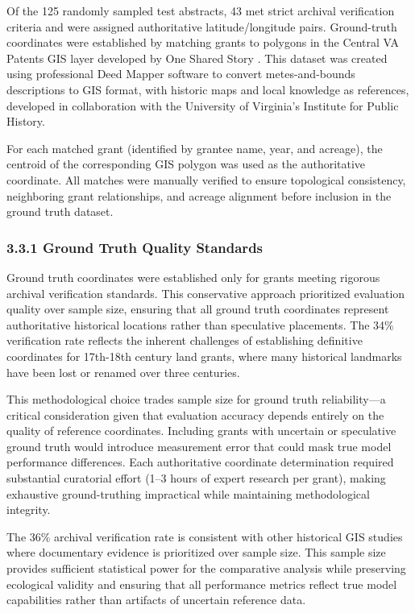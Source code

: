 Of the 125 randomly sampled test abstracts, 43 met strict archival
verification criteria and were assigned authoritative latitude/longitude
pairs. Ground-truth coordinates were established by matching grants to
polygons in the Central VA Patents GIS layer developed by One Shared
Story \citep{central_va_patents_gis}. This dataset was created using
professional Deed Mapper software to convert metes-and-bounds
descriptions to GIS format, with historic maps and local knowledge as
references, developed in collaboration with the University of Virginia's
Institute for Public History.

For each matched grant (identified by grantee name, year, and acreage),
the centroid of the corresponding GIS polygon was used as the
authoritative coordinate. All matches were manually verified to ensure
topological consistency, neighboring grant relationships, and acreage
alignment before inclusion in the ground truth dataset.

\subsubsection{3.3.1 Ground Truth Quality
Standards}\label{ground-truth-quality-standards}

Ground truth coordinates were established only for grants meeting
rigorous archival verification standards. This conservative approach
prioritized evaluation quality over sample size, ensuring that all
ground truth coordinates represent authoritative historical locations
rather than speculative placements. The 34\% verification rate reflects
the inherent challenges of establishing definitive coordinates for
17th-18th century land grants, where many historical landmarks have been
lost or renamed over three centuries.

This methodological choice trades sample size for ground truth
reliability---a critical consideration given that evaluation accuracy
depends entirely on the quality of reference coordinates. Including
grants with uncertain or speculative ground truth would introduce
measurement error that could mask true model performance differences.
Each authoritative coordinate determination required substantial
curatorial effort (1--3 hours of expert research per grant), making
exhaustive ground-truthing impractical while maintaining methodological
integrity.

The 36\% archival verification rate is consistent with other historical
GIS studies where documentary evidence is prioritized over sample size.
This sample size provides sufficient statistical power for the
comparative analysis while preserving ecological validity and ensuring
that all performance metrics reflect true model capabilities rather than
artifacts of uncertain reference data.

